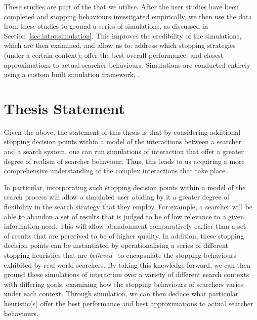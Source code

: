These studies are part of the  that we utilise. After the user studies have been completed and stopping behaviours investigated empirically, we then use the data from these studies to ground a series of simulations, as discussed in Section~\ref{sec:intro:simulation}. This improves the credibility of the simulations, which are then examined, and allow us to: address which stopping strategies (under a certain context); offer  the best overall performance; and  closest approximations to actual searcher behaviours. Simulations are conducted entirely using a custom built simulation framework, .

\section{Thesis Statement}
Given the above, the statement of this thesis is that by considering additional stopping decision points within a model of the interactions between a searcher and a search system, one can run simulations of interaction that offer a greater degree of realism of searcher behaviour. Thus, this leads to us acquiring a more comprehensive understanding of the complex interactions that take place.


In particular, incorporating such stopping decision points within a model of the search process will allow a simulated user abiding by it a greater degree of flexibility in the search strategy that they employ. For example, a searcher will be able to abandon a set of results that is judged to be of low relevance to a given information need. This will allow abandonment comparatively earlier than a set of results that are perceived to be of higher quality. In addition, these stopping decision points can be instantiated by operationalising a series of different stopping heuristics that are \emph{believed}~\citep{maxwell2015stopping_strategies} to encapsulate the stopping behaviours exhibited by real-world searchers. By taking this knowledge forward, we can then ground these simulations of interaction over a variety of different search contexts with differing goals, examining how the stopping behaviours of searchers varies under each context. Through simulation, we can then deduce what particular heuristic(s) offer the best performance and best approximations to actual searcher behaviours.

